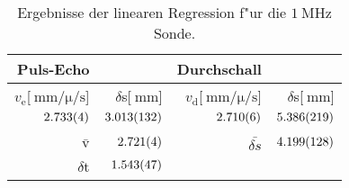 \begin{table}[!h]
\begin{center}
\begin{tabular}{|r|r|r|r|}
\hline
Puls-Echo & & Durchschall & \\
\hline
\hline
$v_\mathrm{e}$[$\SI{}{\milli\meter\per\micro\per\second}$] & $\delta$s[$\SI{}{\milli\meter}$] & $v_\mathrm{d}$[$\SI{}{\milli\meter\per\micro\per\second}$]& $\delta$s[$\SI{}{\milli\meter}$]\\
\hline
$\SI{2.733 (4)}{}$ & $\SI{3.013 (132)}{}$ & $\SI{2.710 (6)}{}$ & $\SI{5.386 (219)}{}$\\
\hline
\hline
&&&\\
$\bar{\mathrm{v}}$ & $\SI{2.721 (4)}{}$ & $\bar{\delta s}$ & $\SI{4.199 (128)}{}$\\
\hline
$\delta$t & $\SI{1.543 (47)}{}$ & &\\
\hline
\end{tabular}
\caption[]{Ergebnisse der linearen Regression f"ur die $\SI{1}{\mega\hertz}$ Sonde.}
\label{r1}
\end{center}
\end{table}